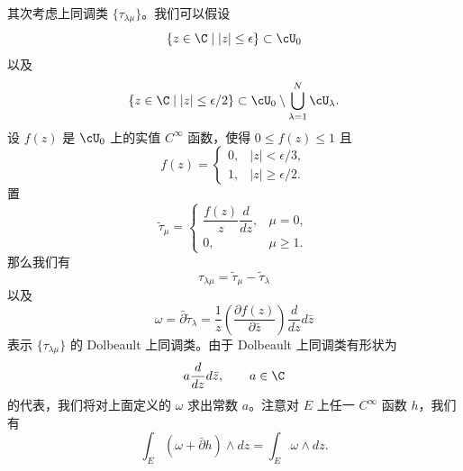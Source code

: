 \begin{example}[1.4]

其次考虑上同调类 $\{\tau_{\lambda\mu}\}$。我们可以假设
\[
\{z\in\C\mid |z|\le\epsilon\}\subset\cU_0
\]
以及
\[
\{z\in\C\mid |z|\le\epsilon/2\}\subset\cU_0\setminus\bigcup_{\lambda=1}^N\cU_\lambda .
\]
设 $f(z)$ 是 $\cU_0$ 上的实值 $C^\infty$ 函数，使得 $0\le f(z)\le 1$ 且
\begin{equation}
f(z)=
\begin{cases}
0, & |z|<\epsilon/3,\\
1, & |z|\ge\epsilon/2.
\end{cases} \tag{1.6}
\end{equation}
置
\[
\tilde\tau_\mu=
\begin{cases}
\dfrac{f(z)}{z}\dfrac{d}{dz}, & \mu=0,\\[2mm]
0, & \mu\ge 1.
\end{cases}
\]
那么我们有
\[
\tau_{\lambda\mu}=\tilde\tau_\mu-\tilde\tau_\lambda
\]
以及
\[
\omega=\bar\partial\tilde\tau_\lambda=\frac{1}{z}\left(\frac{\partial f(z)}{\partial\bar z}\right)\frac{d}{dz}d\bar z
\]
表示 $\{\tau_{\lambda\mu}\}$ 的 Dolbeault 上同调类。由于 Dolbeault 上同调类有形状为
\[
a\frac{d}{dz}d\bar z,\qquad a\in\C
\]
的代表，我们将对上面定义的 $\omega$ 求出常数 $a$。注意对 $E$ 上任一 $C^\infty$ 函数 $h$，我们有
\[
\int_E(\omega+\bar\partial h)\wedge dz=\int_E\omega\wedge dz .
\]


\end{example}

